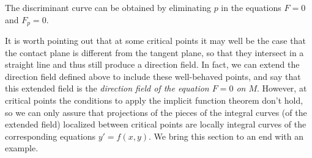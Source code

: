 \begin{remark} The discriminant curve can be obtained by eliminating $p$ in the equations $F=0$ and $F_p=0$.

\end{remark}

It is worth pointing out that at some critical points it may well be the case that the contact plane is different from the tangent plane, so that they intersect in a straight line and thus still produce a direction field. In fact, we can extend the direction field defined above to include these well-behaved points, and say that this extended field is the \textit{direction field of the equation $F=0$ on $M$}. However, at critical points the conditions to apply the implicit function theorem don't hold, so we can only assure that projections of the pieces of the integral curves (of the extended field) localized between critical points are locally integral curves of the corresponding equations $y'=f(x,y)$. We bring this section to an end with an example.

